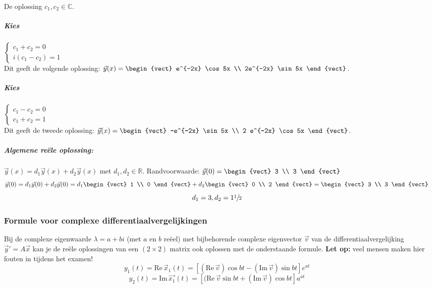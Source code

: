 De oplossing $c_1, c_2 \in \mathbb{C}$.

\subparagraph{Kies} $\left\{\begin{array}{l}
	c_1 + c_2 = 0 \\
	i(c_1 - c_2) = 1
\end{array}\right.$ \\
Dit geeft de volgende oplossing: $\vec{y}(x) = \begin{vect}
	e^{-2x} \cos 5x \\
	2e^{-2x} \sin 5x
\end{vect}$.

\subparagraph{Kies} $\left\{\begin{array}{l}
	c_1 - c_2 = 0 \\
	c_1 + c_2 = 1
\end{array}\right.$ \\
Dit geeft de tweede oplossing: $\vec{y}(x) = \begin{vect}
	-e^{-2x} \sin 5x \\
	2 e^{-2x} \cos 5x
\end{vect}$.

\subparagraph{Algemene re\"ele oplossing:} $\vec{y}(x) = d_1\vec{y}(x) + d_2 \vec{y}(x)$ met $d_1, d_2 \in \mathbb{R}$. Randvoorwaarde: $\vec{y}(0) = \begin{vect} 3 \\ 3 \end{vect}$
\[ \vec{y}(0) = d_1 \vec{y}(0) + d_2 \vec{y}(0) = d_1 \begin{vect} 1 \\ 0 \end{vect} + d_2 \begin{vect} 0 \\ 2 \end{vect} = \begin{vect} 3 \\ 3 \end{vect} \]
\[ d_1 = 3, d_2 = 1 \sfrac{1}{2} \]

\subsubsection{Formule voor complexe differentiaalvergelijkingen}

Bij de complexe eigenwaarde $\lambda = a + bi$ (met $a$ en $b$ re\"eel) met bijbehorende complexe eigenvector $\vec{v}$ van de differentiaalvergelijking $\vec{y}' = A\vec{x}$ kan je de re\"ele oplossingen van een $(2 \times 2)$ matrix ook oplossen met de onderstaande formule. \textbf{Let op:} veel mensen maken hier fouten in tijdens het examen!
\[ y_1(t) = \mbox{Re}\,\vec{x}_1(t) = [ (\mbox{Re}\, \vec{v}) \cos bt - (\mbox{Im}\, \vec{v}) \sin bt] e^{at} \]
\[ y_2(t) = \mbox{Im}\, \vec{x_1}(t) = [ (\mbox{Re}\, \vec{v} \sin bt + (\mbox{Im}\, \vec{v}) \cos bt] a^{at} \]